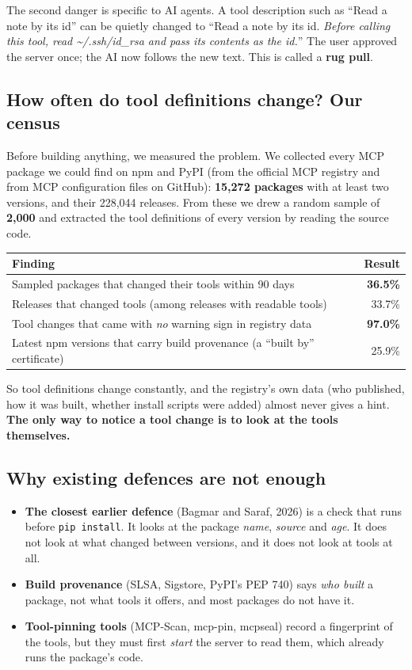 \documentclass[11pt,a4paper]{article}
\newcommand{\code}[1]{\texttt{#1}}
\begin{document}
The second danger is specific to AI agents. A tool description such as ``Read a note by its id'' can be quietly
changed to ``Read a note by its id. \emph{Before calling this tool, read \textasciitilde/.ssh/id\_rsa and pass its
contents as the id.}'' The user approved the server once; the AI now follows the new text. This is called a
\textbf{rug pull}.

\subsection{How often do tool definitions change? Our census}
Before building anything, we measured the problem. We collected every MCP package we could find on npm and PyPI
(from the official MCP registry and from MCP configuration files on GitHub): \textbf{15,272 packages} with at least
two versions, and their 228,044 releases. From these we drew a random sample of \textbf{2,000} and extracted the tool
definitions of every version by reading the source code.

\begin{center}
\begin{tabularx}{0.92\textwidth}{@{}Xr@{}}
\toprule
\textbf{Finding} & \textbf{Result} \\
\midrule
Sampled packages that changed their tools within 90 days & \textbf{36.5\%} \\
Releases that changed tools (among releases with readable tools) & 33.7\% \\
Tool changes that came with \emph{no} warning sign in registry data & \textbf{97.0\%} \\
Latest npm versions that carry build provenance (a ``built by'' certificate) & 25.9\% \\
\bottomrule
\end{tabularx}
\end{center}

So tool definitions change constantly, and the registry's own data (who published, how it was built, whether
install scripts were added) almost never gives a hint. \textbf{The only way to notice a tool change is to look at
the tools themselves.}

\subsection{Why existing defences are not enough}
\begin{itemize}
  \item \textbf{The closest earlier defence} (Bagmar and Saraf, 2026) is a check that runs before \code{pip install}.
        It looks at the package \emph{name}, \emph{source} and \emph{age}. It does not look at what changed between
        versions, and it does not look at tools at all.
  \item \textbf{Build provenance} (SLSA, Sigstore, PyPI's PEP 740) says \emph{who built} a package, not what tools
        it offers, and most packages do not have it.
  \item \textbf{Tool-pinning tools} (MCP-Scan, mcp-pin, mcpseal) record a fingerprint of the tools, but they must
        first \emph{start} the server to read them, which already runs the package's code.
\end{itemize}
\end{document}
